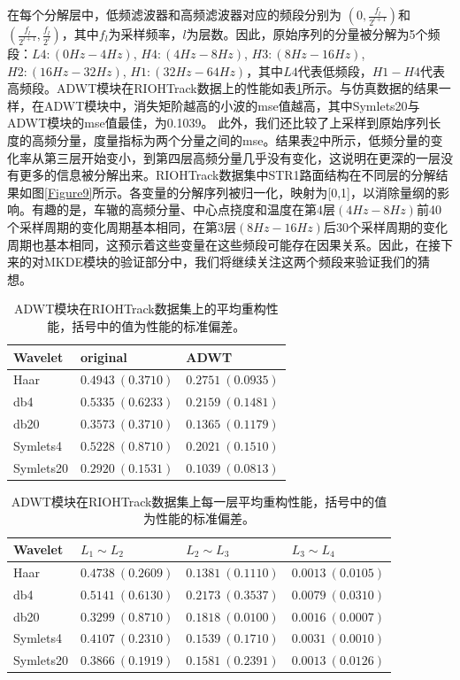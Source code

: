 在每个分解层中，低频滤波器和高频滤波器对应的频段分别为 $(0, \frac{f_{l}}{2^{l+1}})$和$(\frac{f_{l}}{2^{l+1}},\frac{f_{l}}{2^{l}})$，其中$f_{l}$为采样频率，$l$为层数。因此，原始序列的分量被分解为5个频段：$L{4}: (0Hz-4Hz)$, $H{4}: (4Hz-8Hz)$, $H{3}: (8Hz-16Hz)$, $H{2}: (16Hz-32Hz)$, $H{1}: (32Hz-64Hz)$，其中$L{4}$代表低频段，$H{1}-H{4}$代表高频段。ADWT模块在RIOHTrack数据上的性能如表\ref{table6}所示。与仿真数据的结果一样，在ADWT模块中，消失矩阶越高的小波的mse值越高，其中Symlets20与ADWT模块的mse值最佳，为0.1039。 此外，我们还比较了上采样到原始序列长度的高频分量，度量指标为两个分量之间的mse。结果表\ref{table6_1}中所示，低频分量的变化率从第三层开始变小，到第四层高频分量几乎没有变化，这说明在更深的一层没有更多的信息被分解出来。RIOHTrack数据集中STR1路面结构在不同层的分解结果如图\ref{Figure9}所示。各变量的分解序列被归一化，映射为[0,1]，以消除量纲的影响。有趣的是，车辙的高频分量、中心点挠度和温度在第4层$(4Hz-8Hz)$前40个采样周期的变化周期基本相同，在第3层$(8Hz-16Hz)$后30个采样周期的变化周期也基本相同，这预示着这些变量在这些频段可能存在因果关系。因此，在接下来的对MKDE模块的验证部分中，我们将继续关注这两个频段来验证我们的猜想。

\begin{table}[!ht]
\centering
\caption{ADWT模块在RIOHTrack数据集上的平均重构性能，括号中的值为性能的标准偏差。}
\begin{tabular}{lll}
 \hline
  Wavelet & original &  ADWT  \\
  \hline
  Haar & $0.4943\ (0.3710)$ & $0.2751\ (0.0935)$\\
  \hline
  db4 & $0.5335\ (0.6233)$ & $0.2159\ (0.1481)$\\
  \hline
  db20 & $0.3573\ (0.3710)$ & $0.1365\ (0.1179)$\\
  \hline
  Symlets4  & $0.5228\ (0.8710)$ & $0.2021\ (0.1510)$\\
  \hline
  Symlets20  & $0.2920\ (0.1531)$ & $0.1039\ (0.0813)$\\
  \hline
\end{tabular}
\label{table6}
\end{table}


\begin{table}[!ht]
\centering
\caption{ADWT模块在RIOHTrack数据集上每一层平均重构性能，括号中的值为性能的标准偏差。}
\begin{tabular}{llll}
 \hline
  Wavelet  &  $L_{1}\sim L_{2}$&  $L_{2}\sim L_{3}$&  $L_{3}\sim L_{4}$ \\
  \hline
  Haar & $0.4738\ (0.2609)$ & $0.1381\ (0.1110)$& $0.0013\ (0.0105)$\\
  \hline
  db4 & $0.5141\ (0.6130)$ & $0.2173\ (0.3537)$& $0.0079\ (0.0310)$\\
  \hline
  db20 & $ 0.3299\ (0.8710)$ & $0.1818\ (0.0100)$& $0.0016\ (0.0007)$\\
  \hline
  Symlets4  & $0.4107\ (0.2310)$ & $0.1539\ (0.1710)$& $0.0031\ (0.0010)$\\
  \hline
  Symlets20  & $0.3866\ (0.1919)$ & $0.1581\ (0.2391)$& $0.0013\ (0.0126)$\\
  \hline
\end{tabular}
\label{table6_1}
\end{table}


